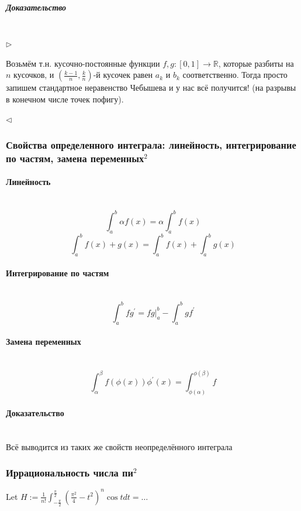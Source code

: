 \documentclass{article}
\let\vanillaparagraph\paragraph
\let\vanillasubparagraph\subparagraph
\renewcommand{\paragraph}[1]{\vanillaparagraph{#1}\mbox{}\\}
\renewcommand{\subparagraph}[1]{\vanillasubparagraph{#1}\mbox{}\\}
\begin{document}
\subparagraph{Доказательство}

$\rhd$

Возьмём т.н. кусочно-постоянные функции $f, g: [0, 1] \rightarrow \mathbb{R}$, которые разбиты на $n$ кусочков, и $\left(\frac{k - 1}{n}, \frac{k}{n}\right)$-й кусочек равен $a_k$ и $b_k$ соответственно. Тогда просто запишем стандартное неравенство Чебышева и у нас всё получится! (на разрывы в конечном числе точек пофигу).

$\lhd$


\subsubsection{Свойства определенного интеграла: линейность, интегрирование по частям, замена переменных\texorpdfstring{$^2$}{}}

\paragraph{Линейность}

\[\int_a^b{\alpha f(x)} = \alpha \int_a^b{f(x)}\]
\[\int_a^b{f(x) + g(x)} = \int_a^b{f(x)} + \int_a^b{g(x)}\]


\paragraph{Интегрирование по частям}

\[\int_a^b{fg^\prime} = fg|_a^b - \int_a^b{gf^\prime}\]


\paragraph{Замена переменных}

\[\int_\alpha^\beta{f(\phi(x))\phi^\prime(x)} = \int_{\phi(\alpha)}^{\phi(\beta)}{f}\]

\paragraph{Доказательство}

Всё выводится из таких же свойств неопределённого интеграла

\subsubsection{Иррациональность числа пи\texorpdfstring{$^2$}{}}

Let $H := \frac{1}{n!}\int_{-\frac{\pi}{2}}^{\frac{\pi}{2}}{\left(\frac{\pi^2}{4} - t^2\right)^n\cos t dt} = \ldots$
\end{document}
